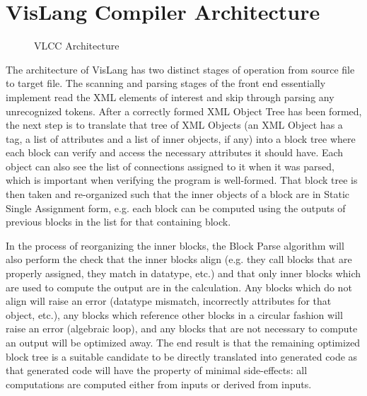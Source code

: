\section{VisLang Compiler Architecture}

\begin{wrapfigure}[25]{r}[-1.2cm]{0.25\textwidth}
  \centering
  \caption{VLCC Architecture}
  \label{arch:vlcc}
\end{wrapfigure}

The architecture of VisLang has two distinct stages of operation from source file to
target file. The scanning and parsing stages of the front end essentially implement
read the XML elements of interest and skip through parsing any unrecognized tokens.
After a correctly formed XML Object Tree has been formed, the next step is to translate
that tree of XML Objects (an XML Object has a tag, a list of attributes and a list of
inner objects, if any) into a block tree where each block can verify and access the
necessary attributes it should have. Each object can also see the list of connections
assigned to it when it was parsed, which is important when verifying the program is
well-formed. That block tree is then taken and re-organized such that the inner objects
of a block are in Static Single Assignment form, e.g. each block can be computed using
the outputs of previous blocks in the list for that containing block.
\par
In the process of reorganizing the inner blocks, the Block Parse algorithm will also
perform the check that the inner blocks align (e.g. they call blocks that are properly
assigned, they match in datatype, etc.) and that only inner blocks which are used to
compute the output are in the calculation. Any blocks which do not align will raise an
error (datatype mismatch, incorrectly attributes for that object, etc.), any blocks
which reference other blocks in a circular fashion will raise an error (algebraic loop),
and any blocks that are not necessary to compute an output will be optimized away. The
end result is that the remaining optimized block tree is a suitable candidate to be
directly translated into generated code as that generated code will have the property
of minimal side-effects: all computations are computed either from inputs or derived
from inputs.
